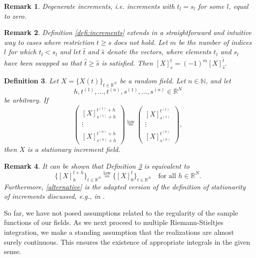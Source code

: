 \documentclass[english, a4paper, 12pt,reqno]{amsart}
\newcommand\myworries[1]{\textcolor{red}{#1}}
\newtheorem{defi}{Definition}[section]
\newtheorem{rem}[defi]{Remark}
\begin{document}

\begin{rem}
\label{rem:degeneracy}
Degenerate increments, i.e. increments with $t_l = s_l$ for some $l$, equal to zero. 
\end{rem}

\begin{rem}
\label{rem:extension}
Definition \ref{defi:increments} extends in a straightforward and intuitive way to cases where restriction $t \geq s$ does not hold. Let $m$ be the number of indices $l$ for which $t_l < s_l$ and let $\hat{t}$ and $\hat{s}$ denote the vectors, where elements $t_l$ and $s_l$ have been swapped so that $\hat{t} \geq \hat{s}$ is satisfied. Then
$[X]_s^t = (-1)^m [X]_{\hat{s}}^{\hat{t}}.$
\end{rem}


\begin{defi}
\label{defi:stationaryincrements}
Let $X = \{X(t)\}_{t\in\mathbb{R}^N}$ be a random field. Let $n\in\mathbb{N}$, and let 
$$h, t^{(1)}, \dots, t^{(n)}, s^{(1)}, \dots, s^{(n)} \in \mathbb{R}^N$$
be arbitrary. If 
\begin{equation*}
\begin{pmatrix}
[X]_{s^{(1)}+h}^{t^{(1)}+h}\\
\vdots\\
[X]_{s^{(n)}+h}^{t^{(n)}+h}
\end{pmatrix} \overset{\text{law}}{=} \begin{pmatrix}
[X]_{s^{(1)}}^{t^{(1)}}\\
\vdots\\
[X]_{s^{(n)}}^{t^{(n)}}
\end{pmatrix},
\end{equation*}
then $X$ is a stationary increment field.
\end{defi}

\begin{rem}
\label{rem:equivalent}
It can be shown that Definition \ref{defi:stationaryincrements} is equivalent to 
\begin{equation}
\label{alternative}
\{ [X]_h^{t+h}\}_{t\in\mathbb{R}^N} \overset{\text{law}}{=} \{[X]_0^t\}_{t\in\mathbb{R}^N} \quad\text{for all } h\in\mathbb{R}^N.
\end{equation}
Furthermore, \eqref{alternative} is the adapted version of the definition of stationarity of increments discussed, e.g., in \cite{makogin2019gaussian}.
\end{rem}
So far, we have not posed assumptions related to the regularity of the sample functions of our fields. As we next proceed to multiple Riemann-Stieltjes integration, we make a standing assumption that the realizations are almost surely continuous. This ensures the existence of appropriate integrals in the given sense. 
\end{document}
